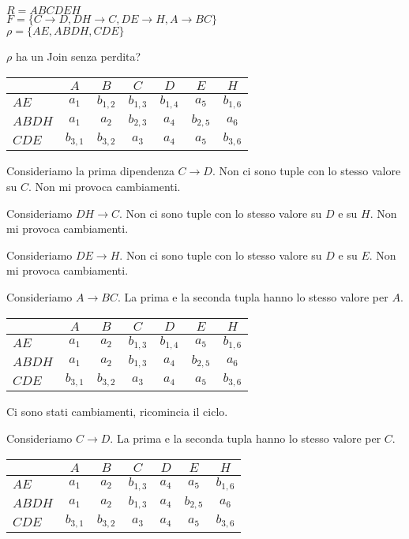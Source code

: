 \begin{exmp}
$R = ABCDEH$ \\
$F = \{ C \to D, DH \to C, DE \to H, A \to BC \}$ \\
$\rho = \{ AE, ABDH, CDE\}$

$\rho$ ha un Join senza perdita?

\begin{tabular}{l|*{6}{c}}
& $A$ & $B$ & $C$ & $D$ & $E$ & $H$ \\
\hline
$AE$ & $a_1$ & $b_{1,2}$ & $b_{1,3}$ & $b_{1,4}$ & $a_5$ & $b_{1,6}$ \\
$ABDH$ & $a_1$ & $a_2$ & $b_{2,3}$ & $a_4$ & $b_{2,5}$ & $a_6$ \\
$CDE$ & $b_{3,1}$ & $b_{3,2}$ & $a_3$ & $a_4$ & $a_5$ & $b_{3,6}$
\end{tabular}

Consideriamo la prima dipendenza $C \to D$. Non ci sono tuple con lo stesso valore su $C$. Non mi provoca cambiamenti.

Consideriamo $DH \to C$. Non ci sono tuple con lo stesso valore su $D$ e su $H$. Non mi provoca cambiamenti.

Consideriamo $DE \to H$. Non ci sono tuple con lo stesso valore su $D$ e su $E$. Non mi provoca cambiamenti.

Consideriamo $A \to BC$. La prima e la seconda tupla hanno lo stesso valore per $A$.

\begin{tabular}{l|*{6}{c}}
& $A$ & $B$ & $C$ & $D$ & $E$ & $H$ \\
\hline
$AE$ & $a_1$ & \cellcolor{green!20} $a_2$ & $b_{1,3}$ & $b_{1,4}$ & $a_5$ & $b_{1,6}$ \\
$ABDH$ & $a_1$ & $a_2$ & \cellcolor{green!20} $b_{1,3}$ & $a_4$ & $b_{2,5}$ & $a_6$ \\
$CDE$ & $b_{3,1}$ & $b_{3,2}$ & $a_3$ & $a_4$ & $a_5$ & $b_{3,6}$
\end{tabular}

Ci sono stati cambiamenti, ricomincia il ciclo.

Consideriamo $C \to D$. La prima e la seconda tupla hanno lo stesso valore per $C$.

\begin{tabular}{l|*{6}{c}}
& $A$ & $B$ & $C$ & $D$ & $E$ & $H$ \\
\hline
$AE$ & $a_1$ & $a_2$ & $b_{1,3}$ & \cellcolor{green!20} $a_4$ & $a_5$ & $b_{1,6}$ \\
$ABDH$ & $a_1$ & $a_2$ & $b_{1,3}$ & $a_4$ & $b_{2,5}$ & $a_6$ \\
$CDE$ & $b_{3,1}$ & $b_{3,2}$ & $a_3$ & $a_4$ & $a_5$ & $b_{3,6}$
\end{tabular}


\end{exmp}
